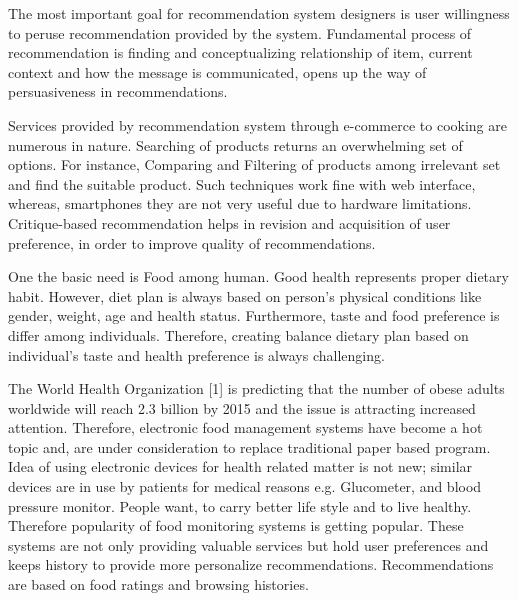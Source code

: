 The most important goal for recommendation system designers is user willingness to peruse recommendation provided by the system. Fundamental process of recommendation is finding and conceptualizing relationship of item, current context and how the message is communicated, opens up the way of persuasiveness in recommendations.\newline

Services provided by recommendation system through e-commerce to cooking are numerous in nature. Searching of products returns an overwhelming set of options. For instance, Comparing and Filtering of products among irrelevant set and find the suitable product. Such techniques work fine with web interface, whereas, smartphones they are not very useful due to hardware limitations. Critique-based recommendation helps in revision and acquisition of user preference, in order to improve quality of recommendations.\newline

One the basic need is Food among human. Good health represents proper dietary habit. However, diet plan is always based on person’s physical conditions like gender, weight, age and health status. Furthermore, taste and food preference is differ among individuals. Therefore, creating balance dietary plan based on individual’s taste and health preference is always challenging.\newline

The World Health Organization [1] is predicting that the number of obese adults worldwide will reach 2.3 billion by 2015 and the issue is attracting increased attention. Therefore, electronic food management systems have become a hot topic and, are under consideration to replace traditional paper based program. Idea of using electronic devices for health related matter is not new; similar devices are in use by patients for medical reasons e.g. Glucometer, and blood pressure monitor. People want, to carry better life style and to live healthy. Therefore popularity of food monitoring systems is getting popular.  These systems are not only providing valuable services but hold user preferences and keeps history to provide more personalize recommendations. Recommendations are based on food ratings and browsing histories.\newline

